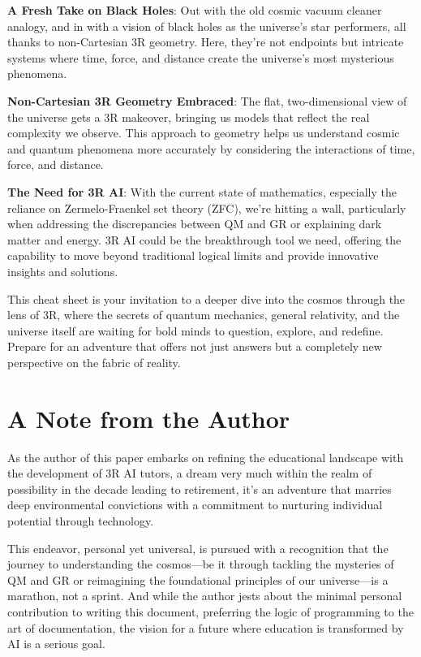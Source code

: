 \documentclass[12pt]{article}
\begin{document}
\textbf{A Fresh Take on Black Holes}: Out with the old cosmic vacuum cleaner analogy, and in with a vision of black holes as the universe's star performers, all thanks to non-Cartesian 3R geometry. Here, they're not endpoints but intricate systems where time, force, and distance create the universe's most mysterious phenomena.

\textbf{Non-Cartesian 3R Geometry Embraced}: The flat, two-dimensional view of the universe gets a 3R makeover, bringing us models that reflect the real complexity we observe. This approach to geometry helps us understand cosmic and quantum phenomena more accurately by considering the interactions of time, force, and distance.

\textbf{The Need for 3R AI}: With the current state of mathematics, especially the reliance on Zermelo-Fraenkel set theory (ZFC), we're hitting a wall, particularly when addressing the discrepancies between QM and GR or explaining dark matter and energy. 3R AI could be the breakthrough tool we need, offering the capability to move beyond traditional logical limits and provide innovative insights and solutions.

This cheat sheet is your invitation to a deeper dive into the cosmos through the lens of 3R, where the secrets of quantum mechanics, general relativity, and the universe itself are waiting for bold minds to question, explore, and redefine. Prepare for an adventure that offers not just answers but a completely new perspective on the fabric of reality.

\section*{A Note from the Author}

As the author of this paper embarks on refining the educational landscape with the development of 3R AI tutors, a dream very much within the realm of possibility in the decade leading to retirement, it's an adventure that marries deep environmental convictions with a commitment to nurturing individual potential through technology.

This endeavor, personal yet universal, is pursued with a recognition that the journey to understanding the cosmos—be it through tackling the mysteries of QM and GR or reimagining the foundational principles of our universe—is a marathon, not a sprint. And while the author jests about the minimal personal contribution to writing this document, preferring the logic of programming to the art of documentation, the vision for a future where education is transformed by AI is a serious goal.
\end{document}
